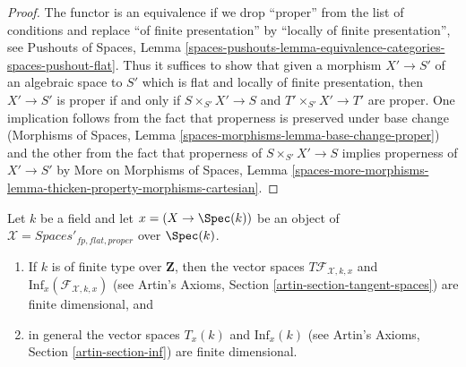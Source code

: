 \begin{proof}
The functor is an equivalence if we drop ``proper'' from the list
of conditions and replace ``of finite presentation'' by
``locally of finite presentation'', see Pushouts of Spaces, Lemma
\ref{spaces-pushouts-lemma-equivalence-categories-spaces-pushout-flat}.
Thus it suffices to show that given a morphism
$X' \to S'$ of an algebraic space to $S'$ which is
flat and locally of finite presentation, then
$X' \to S'$ is proper if and only if $S \times_{S'} X' \to S$
and $T' \times_{S'} X' \to T'$ are proper.
One implication follows from the fact that
properness is preserved under base change
(Morphisms of Spaces, Lemma \ref{spaces-morphisms-lemma-base-change-proper})
and the other from the fact that properness of $S \times_{S'} X' \to S$
implies properness of $X' \to S'$ by
More on Morphisms of Spaces, Lemma
\ref{spaces-more-morphisms-lemma-thicken-property-morphisms-cartesian}.
\end{proof}

\begin{lemma}
\label{lemma-spaces-tangent-space}
Let $k$ be a field and let $x = (X \to \Spec(k))$ be an object of
$\mathcal{X} = \textit{Spaces}'_{fp, flat, proper}$ over $\Spec(k)$.
\begin{enumerate}
\item If $k$ is of finite type over $\mathbf{Z}$, then
the vector spaces $T\mathcal{F}_{\mathcal{X}, k, x}$ and
$\text{Inf}_x(\mathcal{F}_{\mathcal{X}, k, x})$
(see Artin's Axioms, Section \ref{artin-section-tangent-spaces})
are finite dimensional, and
\item in general the vector spaces $T_x(k)$ and $\text{Inf}_x(k)$
(see Artin's Axioms, Section \ref{artin-section-inf})
are finite dimensional.
\end{enumerate}
\end{lemma}

